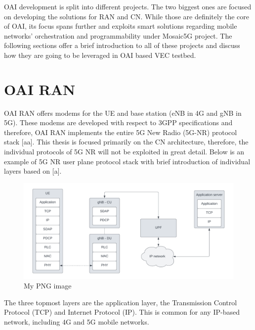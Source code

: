 \documentclass[12pt,a4paper,twoside]{report}
\begin{document}
OAI development is split into different projects. The two biggest ones are focused on developing the solutions for RAN and CN. While those are definitely the core of OAI, its focus spans further and exploits smart solutions regarding mobile networks’ orchestration and programmability under Mosaic5G project. The following sections offer a brief introduction to all of these projects and discuss how they are going to be leveraged in OAI based VEC testbed.

\section{OAI RAN}
OAI RAN offers modems for the UE and base station (eNB in 4G and gNB in 5G). These modems are developed with respect to 3GPP specifications and therefore, OAI RAN implements the entire 5G New Radio (5G-NR) protocol stack [aa]. This thesis is focused primarily on the CN architecture, therefore, the individual protocols of 5G NR will not be exploited in great detail. Below is an example of 5G NR user plane protocol stack with brief introduction of individual layers based on [a].

\begin{figure}[ht]
	\centering
	\includegraphics[width=13cm]{./images/5G-NR-protstack.png} 
	\caption{My PNG image}
\end{figure}
The three topmost layers are the application layer, the Transmission Control Protocol (TCP) and Internet Protocol (IP). This is common for any IP-based network, including 4G and 5G mobile networks.
\end{document}

